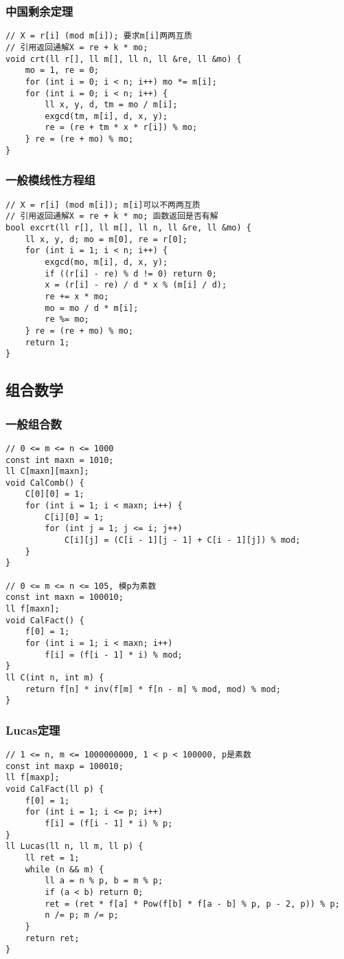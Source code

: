 \documentclass[a4paper]{article}
\begin{document}
\subsubsection{中国剩余定理}
\begin{lstlisting}
// X = r[i] (mod m[i]); 要求m[i]两两互质
// 引用返回通解X = re + k * mo;
void crt(ll r[], ll m[], ll n, ll &re, ll &mo) {
	mo = 1, re = 0;
	for (int i = 0; i < n; i++) mo *= m[i];
	for (int i = 0; i < n; i++) {
		ll x, y, d, tm = mo / m[i];
		exgcd(tm, m[i], d, x, y);
		re = (re + tm * x * r[i]) % mo;
	} re = (re + mo) % mo;
}
\end{lstlisting}
\subsubsection{一般模线性方程组}
\begin{lstlisting}
// X = r[i] (mod m[i]); m[i]可以不两两互质
// 引用返回通解X = re + k * mo; 函数返回是否有解
bool excrt(ll r[], ll m[], ll n, ll &re, ll &mo) {
	ll x, y, d; mo = m[0], re = r[0];
	for (int i = 1; i < n; i++) {
		exgcd(mo, m[i], d, x, y);
		if ((r[i] - re) % d != 0) return 0;
		x = (r[i] - re) / d * x % (m[i] / d);
		re += x * mo;
		mo = mo / d * m[i];
		re %= mo;
	} re = (re + mo) % mo;
	return 1;
}
\end{lstlisting}
\subsection{组合数学}
\subsubsection{一般组合数}
\begin{lstlisting}
// 0 <= m <= n <= 1000
const int maxn = 1010;
ll C[maxn][maxn];
void CalComb() {
	C[0][0] = 1;
	for (int i = 1; i < maxn; i++) {
		C[i][0] = 1;
		for (int j = 1; j <= i; j++)
			C[i][j] = (C[i - 1][j - 1] + C[i - 1][j]) % mod;
	}
}

// 0 <= m <= n <= 105, 模p为素数
const int maxn = 100010;
ll f[maxn];
void CalFact() {
	f[0] = 1;
	for (int i = 1; i < maxn; i++)
		f[i] = (f[i - 1] * i) % mod;
}
ll C(int n, int m) {
	return f[n] * inv(f[m] * f[n - m] % mod, mod) % mod;
}
\end{lstlisting}
\subsubsection{Lucas定理}
\begin{lstlisting}
// 1 <= n, m <= 1000000000, 1 < p < 100000, p是素数
const int maxp = 100010;
ll f[maxp];
void CalFact(ll p) {
	f[0] = 1;
	for (int i = 1; i <= p; i++)
		f[i] = (f[i - 1] * i) % p;
}
ll Lucas(ll n, ll m, ll p) {
	ll ret = 1;
	while (n && m) {
		ll a = n % p, b = m % p;
		if (a < b) return 0;
		ret = (ret * f[a] * Pow(f[b] * f[a - b] % p, p - 2, p)) % p;
		n /= p; m /= p;
	}
	return ret;
}
\end{lstlisting}
\end{document}

